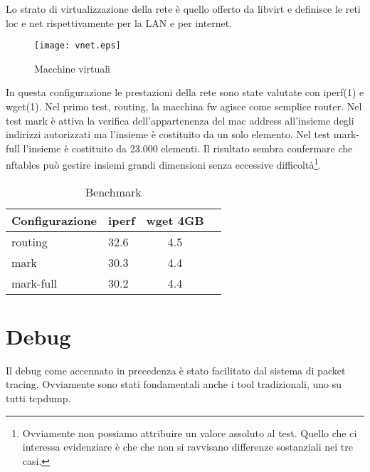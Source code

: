 Lo strato di virtualizzazione della rete \`e quello offerto da libvirt e
definisce le reti loc e net rispettivamente per la LAN e per internet.
\begin{figure}[H]
\begin{center}
      \texttt{[image: vnet.eps]}
      \caption{Macchine virtuali}
      \label{fig:vnet}
\end{center}
\end{figure}
In questa configurazione le prestazioni della rete sono state valutate con
iperf(1) e wget(1).
Nel primo test, routing, la macchina fw agisce come semplice router.
Nel test mark \`e attiva la verifica dell'appartenenza del mac address
all'insieme degli indirizzi autorizzati ma l'insieme \`e costituito da un solo
elemento.
Nel test mark-full l'insieme \`e costituito da 23.000 elementi.
Il risultato sembra confermare che nftables pu\`o gestire
insiemi grandi dimensioni senza eccessive difficolt\`a\footnote{Ovviamente non
possiamo attribuire un valore assoluto al test. Quello che ci interessa
evidenziare \`e che che non si ravvisano differenze sostanziali nei tre casi.}.

\begin{center}
  \label{tab:benchmark}
  \begin{table}[ht]
    \centering %
     \begin{tabular}{@{}llcc@{}}
     \toprule
     {\bf Configurazione} & {\bf iperf} & {\bf wget 4GB} \\ \midrule
         routing  & 32.6                & 4.5 \\
         mark     & 30.3                & 4.4 \\ 
         mark-full& 30.2                & 4.4 \\ \bottomrule
      \end{tabular}  
    \caption{Benchmark} %
  \end{table}
\end{center}


\section{Debug}

Il debug come accennato in precedenza \`e stato facilitato dal sistema di
packet tracing.
Ovviamente sono stati fondamentali anche i tool tradizionali, uno su tutti tcpdump.

